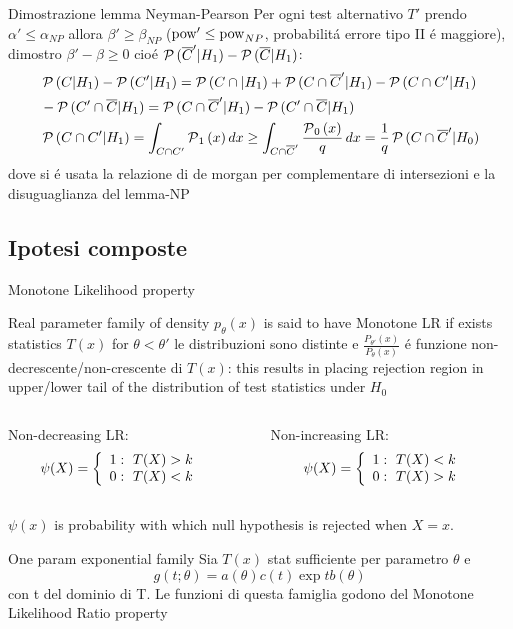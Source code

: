 \documentclass[asd-beamer.tex]{subfiles}%
\begin{document}
\begin{wordonframe}{Dimostrazione lemma Neyman-Pearson}
Per ogni test alternativo $T'$ prendo $\alpha'\leq\alpha_{NP}$ allora $\beta'\geq\beta_{NP}$ ($\operatorname{pow}'\leq\operatorname{pow}_{NP}$, probabilit\'a errore tipo II \'e maggiore), dimostro $\beta'-\beta\geq0$ cio\'e $\operatorname{\mathcal{P}}{(\overline{C}'|H_1)}-\operatorname{\mathcal{P}}{(\overline{C}|H_1)}$:
\begin{align*}
&\operatorname{\mathcal{P}}{(C|H_1)}-\operatorname{\mathcal{P}}{(C'|H_1)}=\operatorname{\mathcal{P}}{(C\cap|H_1)}+\operatorname{\mathcal{P}}{(C\cap\overline{C}'|H_1)}-\operatorname{\mathcal{P}}{(C\cap C'|H_1)}\\
&-\operatorname{\mathcal{P}}{(C'\cap\overline{C}|H_1)}=\operatorname{\mathcal{P}}{(C\cap\overline{C}'|H_1)}-\operatorname{\mathcal{P}}{(C'\cap\overline{C}|H_1)}\\
&\operatorname{\mathcal{P}}{(C\cap C'|H_1)}=\int_{C\cap C'}\operatorname{\mathcal{P}}_1{(x)}\,dx\geq\int_{C\cap \overline{C}'}\frac{\operatorname{\mathcal{P}}_0{(x)}}{q}\,dx=\frac{1}{q}\operatorname{\mathcal{P}}{(C\cap\overline{C}'|H_0)}
\end{align*}
dove si \'e usata la relazione di de morgan per complementare di intersezioni e la disuguaglianza del lemma-NP
\end{wordonframe}

\subsection{Ipotesi composte}

\begin{frame}{Monotone Likelihood property}\frameintoc
\begin{block}{}
Real parameter family of density $p_{\theta}(x)$ is said to have Monotone LR if exists statistics $T(x)$ for $\theta<\theta'$ le distribuzioni sono distinte e $\frac{P_{\theta'}(x)}{P_{\theta}(x)}$ \'e funzione non-decrescente/non-crescente di $T(x)$: this results in placing rejection region in upper/lower tail of the distribution of test statistics under $H_0$
\begin{columns}[T]
	\begin{column}{0.5\textwidth}
		Non-decreasing LR:
		\begin{align*}
		&\psi(X)=\left\{\begin{array}{l}1:\ T(X)>k\\0:\ T(X)<k\\ \end{array}\right.
		\end{align*}
	\end{column}
	\begin{column}{0.5\textwidth}
		Non-increasing LR:
		\begin{align*}
		&\psi(X)=\left\{\begin{array}{l}1:\ T(X)<k\\0:\ T(X)>k\\ \end{array}\right.
		\end{align*}
	\end{column}
\end{columns}
$\psi(x)$ is probability with which null hypothesis is rejected when $X=x$.
\end{block}
\begin{block}{One param exponential family}
Sia $T(x)$ stat sufficiente per parametro $\theta$ e 
\begin{equation*}
g(t;\theta)=a(\theta)c(t)\exp{tb(\theta)}
\end{equation*}
con t del dominio di T. Le funzioni di questa famiglia godono del Monotone Likelihood Ratio property
\end{block}
\end{frame}
\end{document}
